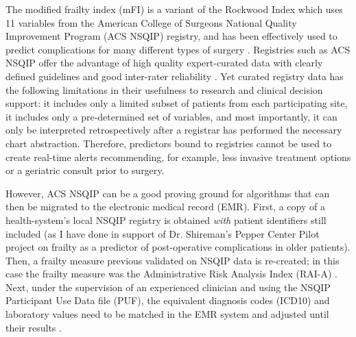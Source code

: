 The modified frailty index (mFI) is a variant of the Rockwood Index which uses 11 variables from the American College of Surgeons National Quality Improvement Program (ACS NSQIP) registry, and has been effectively used to predict complications for many different types of surgery \cite{Uppal_2015,Tsiouris_2013,Bellamy_2017,22491599,23711971,23949353}. Registries such as ACS NSQIP offer the advantage of high quality expert-curated data with clearly defined guidelines and good inter-rater reliability \cite{Shiloach_2010}. Yet curated registry data has the following limitations in their usefulness to research and clinical decision support: it includes only a limited subset of patients from each participating site, it includes only a pre-determined set of variables, and most importantly, it can only be interpreted retrospectively after a registrar has performed the necessary chart abstraction. Therefore, predictors bound to registries cannot be used to create real-time alerts recommending, for example, less invasive treatment options or a geriatric consult prior to surgery.

However, ACS NSQIP can be a good proving ground for algorithms that can then be migrated to the electronic medical record (EMR). First, a copy of a health-system's local NSQIP registry is obtained \textit{with} patient identifiers still included (as I have done in support of Dr. Shireman's Pepper Center Pilot project on frailty as a predictor of post-operative complications in older patients). Then, a frailty measure previous validated on NSQIP data is re-created; in this case the frailty measure was the Administrative Risk Analysis Index (RAI-A) \cite{Hall_2017,Johnson_2014,Melin_2015,Gupta_2011}. Next, under the supervision of an experienced clinician and using the NSQIP Participant Use Data file (PUF), the equivalent diagnosis codes (ICD10) and laboratory values need to be matched in the EMR system and adjusted until their results .